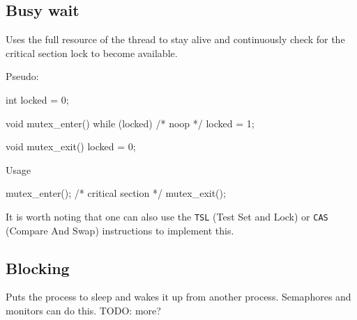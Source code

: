

\subsection{Busy wait}
Uses the full resource of the thread to stay alive and continuously check for the critical section lock to become available.

Pseudo:
\begin{cpp}
int locked = 0;

void mutex_enter() {
  while (locked) { /* noop */ }
  locked = 1;
}

void mutex_exit() {
  locked = 0;
}
\end{cpp}

Usage
\begin{cpp}
mutex_enter();
/* critical section */
mutex_exit();
\end{cpp}

It is worth noting that one can also use the \texttt{TSL} (Test Set and Lock) or \texttt{CAS} (Compare And Swap) instructions to implement this.

\subsection{Blocking}
Puts the process to sleep and wakes it up from another process. Semaphores and monitors can do this. TODO: more?
